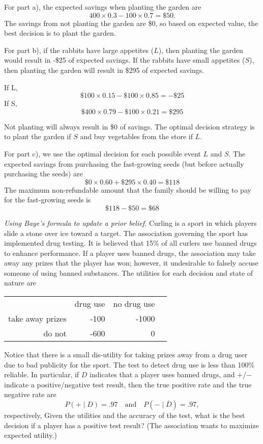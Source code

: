 \begin{solution}
\bs For part a), the expected savings when planting the garden are
\[ 400 \times 0.3  - 100 \times 0.7 = \$50. \]
The savings from not planting the garden are \$0, so based on expected value,
the best decision is to plant the garden.

For part b), if the rabbits have large appetites ($L$), then planting 
the garden would result in -\$25 of expected savings.
If the rabbits have small appetites ($S$), then planting the garden will result in \$295 
of expected savings. 

If L, \[ \$100 \times 0.15 - \$100 \times 0.85 = -\$25 \]
If S, \[ \$400 \times 0.79 - \$100 \times 0.21 = \$295 \]

Not planting will always result in \$0 of savings. 
The optimal decision strategy is to plant the garden if $S$ and buy vegetables 
from the store if $L$.

For part c), we use the optimal decision for each possible event $L$ and $S$. 
The expected savings from purchasing the fast-growing seeds
(but before actually purchasing the seeds) are
\[ \$0 \times 0.60 + \$295 \times 0.40 = \$118 \]
The maximum non-refundable amount that the family should be willing 
to pay for the fast-growing seeds is
\[ \$118 - \$50 = \$68 \]
\end{solution}

\item \emph{Using Baye's formula to update a prior belief.}
Curling is a sport in which players slide a stone over ice toward a
target. The association governing the sport has implemented drug
testing. It is believed that 15\% of all curlers use banned drugs to
enhance performance. If a player uses banned drugs, the association
may take away any prizes that the player has won; however, it
undesirable to falsely accuse someone of using banned substances.  The
utilities for each decision and state of nature are

\begin{center}
\begin{tabular}{rrrr}
& drug use & no drug use \\ \cline{2-3}
take away prizes & -100 & -1000 \\
do not & -600 & 0 
\end{tabular}
\end{center}

Notice that there is a small dis-utility for taking prizes away from a drug user
due to bad publicity for the sport. The test to detect drug use is
less than 100\% reliable. In particular, if $D$ indicates that a 
player uses banned drugs, and $+$/$-$ indicate a positive/negative
test result, then the true positive rate and the true negative rate
are
\[
P(+ \mid D) = .97 \quad \text{and} \quad P(- \mid \overline{D}) = .97,
\]
respectively, Given the utilities and the accuracy of the test, what is the best
decision if a player has a positive test result? (The association
wants to maximize expected utility.)

